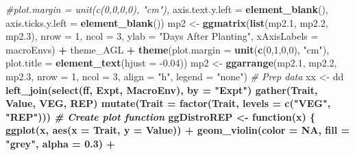 \documentclass[
]{article}
\newenvironment{Shaded}{\begin{snugshade}}{\end{snugshade}}
\newcommand{\CommentTok}[1]{\textcolor[rgb]{0.56,0.35,0.01}{\textit{#1}}}
\newcommand{\ControlFlowTok}[1]{\textcolor[rgb]{0.13,0.29,0.53}{\textbf{#1}}}
\newcommand{\DataTypeTok}[1]{\textcolor[rgb]{0.13,0.29,0.53}{#1}}
\newcommand{\DecValTok}[1]{\textcolor[rgb]{0.00,0.00,0.81}{#1}}
\newcommand{\FloatTok}[1]{\textcolor[rgb]{0.00,0.00,0.81}{#1}}
\newcommand{\KeywordTok}[1]{\textcolor[rgb]{0.13,0.29,0.53}{\textbf{#1}}}
\newcommand{\NormalTok}[1]{#1}
\newcommand{\OperatorTok}[1]{\textcolor[rgb]{0.81,0.36,0.00}{\textbf{#1}}}
\newcommand{\OtherTok}[1]{\textcolor[rgb]{0.56,0.35,0.01}{#1}}
\newcommand{\StringTok}[1]{\textcolor[rgb]{0.31,0.60,0.02}{#1}}
\begin{document}
\begin{Shaded}
\begin{Highlighting}[]
{{{{{{{{{{{        \CommentTok{#plot.margin = unit(c(0,0,0,0), "cm"),}
        \DataTypeTok{axis.text.y.left =} \KeywordTok{element_blank}\NormalTok{(),}
        \DataTypeTok{axis.ticks.y.left =} \KeywordTok{element_blank}\NormalTok{())}
\NormalTok{mp2 <-}\StringTok{ }\KeywordTok{ggmatrix}\NormalTok{(}\KeywordTok{list}\NormalTok{(mp2}\FloatTok{.1}\NormalTok{, mp2}\FloatTok{.2}\NormalTok{, mp2}\FloatTok{.3}\NormalTok{), }\DataTypeTok{nrow =} \DecValTok{1}\NormalTok{, }\DataTypeTok{ncol =} \DecValTok{3}\NormalTok{, }
                \DataTypeTok{ylab =} \StringTok{"Days After Planting"}\NormalTok{, }\DataTypeTok{xAxisLabels =}\NormalTok{ macroEnvs) }\OperatorTok{+}
\StringTok{  }\NormalTok{theme_AGL }\OperatorTok{+}
\StringTok{  }\KeywordTok{theme}\NormalTok{(}\DataTypeTok{plot.margin =} \KeywordTok{unit}\NormalTok{(}\KeywordTok{c}\NormalTok{(}\DecValTok{0}\NormalTok{,}\DecValTok{1}\NormalTok{,}\DecValTok{0}\NormalTok{,}\DecValTok{0}\NormalTok{), }\StringTok{"cm"}\NormalTok{),}
        \DataTypeTok{plot.title =} \KeywordTok{element_text}\NormalTok{(}\DataTypeTok{hjust =} \FloatTok{-0.04}\NormalTok{)) }
\NormalTok{mp2 <-}\StringTok{ }\KeywordTok{ggarrange}\NormalTok{(mp2}\FloatTok{.1}\NormalTok{, mp2}\FloatTok{.2}\NormalTok{, mp2}\FloatTok{.3}\NormalTok{, }\DataTypeTok{nrow =} \DecValTok{1}\NormalTok{, }\DataTypeTok{ncol =} \DecValTok{3}\NormalTok{, }\DataTypeTok{align =} \StringTok{"h"}\NormalTok{, }\DataTypeTok{legend =} \StringTok{"none"}\NormalTok{)}
\CommentTok{# Prep data}
\NormalTok{xx <-}\StringTok{ }\NormalTok{dd }\OperatorTok{%
\StringTok{  }\KeywordTok{left_join}\NormalTok{(}\KeywordTok{select}\NormalTok{(ff, Expt, MacroEnv), }\DataTypeTok{by =} \StringTok{"Expt"}\NormalTok{) }\OperatorTok{%
\StringTok{  }\KeywordTok{gather}\NormalTok{(Trait, Value, VEG, REP) }\OperatorTok{%
\StringTok{  }\KeywordTok{mutate}\NormalTok{(}\DataTypeTok{Trait =} \KeywordTok{factor}\NormalTok{(Trait, }\DataTypeTok{levels =} \KeywordTok{c}\NormalTok{(}\StringTok{"VEG"}\NormalTok{, }\StringTok{"REP"}\NormalTok{)))}
\CommentTok{# Create plot function}
\NormalTok{ggDistroREP <-}\StringTok{ }\ControlFlowTok{function}\NormalTok{(x) \{}
  \KeywordTok{ggplot}\NormalTok{(x, }\KeywordTok{aes}\NormalTok{(}\DataTypeTok{x =}\NormalTok{ Trait, }\DataTypeTok{y =}\NormalTok{ Value)) }\OperatorTok{+}\StringTok{ }
\StringTok{    }\KeywordTok{geom_violin}\NormalTok{(}\DataTypeTok{color =} \OtherTok{NA}\NormalTok{, }\DataTypeTok{fill =} \StringTok{"grey"}\NormalTok{, }\DataTypeTok{alpha =} \FloatTok{0.3}\NormalTok{) }\OperatorTok{+}\StringTok{ }
}}}}}}}}}}}}}}
\end{Highlighting}
\end{Shaded}
\end{document}
